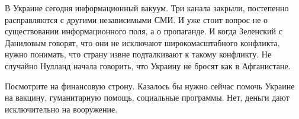 В Украине сегодня информационный вакуум. Три канала закрыли, постепенно
расправляются с другими независимыми СМИ. И уже стоит вопрос не о существовании
информационного поля, а о пропаганде. И когда Зеленский с Даниловым говорят,
что они не исключают широкомасштабного конфликта, нужно понимать, что страну
извне подталкивают к такому конфликту. Не случайно Нулланд начала говорить, что
Украину не бросят как в Афганистане. 

Посмотрите на финансовую строну. Казалось бы нужно сейчас помочь Украине на
вакцину, гуманитарную помощь, социальные программы. Нет, деньги дают
исключительно на вооружение.

